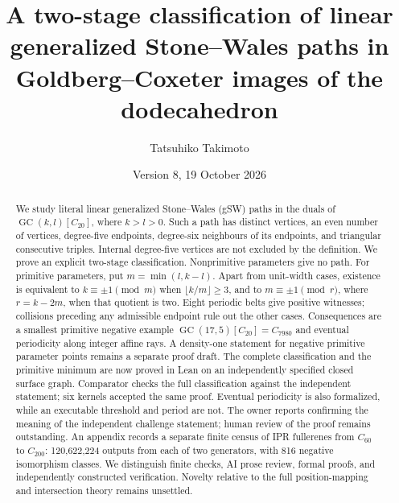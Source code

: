 \documentclass[11pt]{amsart}
\title[Two-stage classification of linear gSW paths]{A two-stage classification of linear generalized Stone--Wales paths in Goldberg--Coxeter images of the dodecahedron}
\author{Tatsuhiko Takimoto}
\date{Version 8, 19 October 2026}
\newcommand{\GC}{\operatorname{GC}}
\begin{document}
\begin{abstract}
We study literal linear generalized Stone--Wales (gSW) paths in the duals
of $\GC(k,l)[C_{20}]$, where $k>l>0$. Such a path has distinct vertices,
an even number of vertices, degree-five endpoints, degree-six neighbours
of its endpoints, and triangular consecutive triples. Internal
degree-five vertices are not excluded by the definition. We prove an
explicit two-stage classification. Nonprimitive
parameters give no path. For primitive parameters, put $m=\min(l,k-l)$.
Apart from unit-width cases, existence is equivalent to $k\equiv\pm1
\pmod m$ when $\lfloor k/m\rfloor\ge3$, and to $m\equiv\pm1\pmod r$,
where $r=k-2m$, when that quotient is two. Eight periodic belts give
positive witnesses; collisions preceding any admissible endpoint rule
out the other cases. Consequences are a smallest primitive negative
example $\GC(17,5)[C_{20}]=C_{7980}$ and eventual periodicity along integer
affine rays. A density-one statement for negative primitive parameter
points remains a separate proof draft. The complete classification and the primitive minimum are now
proved in Lean on an independently specified closed surface graph.
Comparator checks the full classification against the independent
statement; six kernels accepted the same proof. Eventual periodicity
is also formalized, while an executable threshold and period are not.
The owner reports confirming the meaning of the independent challenge
statement; human review of the proof remains outstanding. An appendix records a
separate finite census of IPR fullerenes from $C_{60}$ to $C_{200}$:
120,622,224 outputs from each of two generators, with 816 negative
isomorphism classes. We distinguish finite checks, AI prose review,
formal proofs, and independently constructed verification. Novelty
relative to the full position-mapping and intersection theory remains
unsettled.
\end{abstract}
\maketitle
\end{document}
